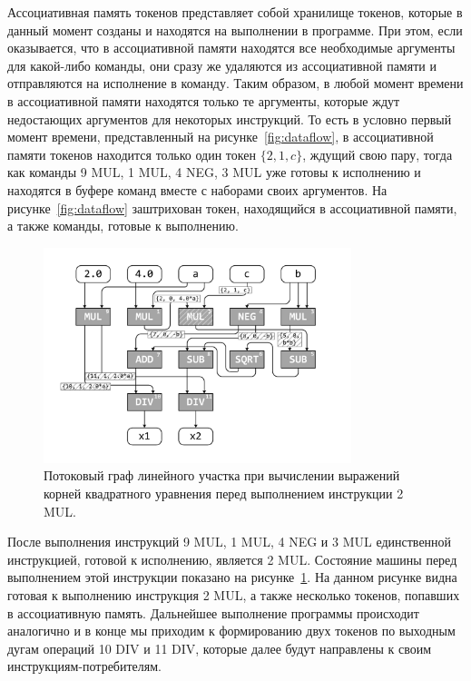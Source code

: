 \documentclass[
11pt,%
tightenlines,%
twoside,%
onecolumn,%
nofloats,%
nobibnotes,%
nofootinbib,%
superscriptaddress,%
noshowpacs,%
centertags]%
{revtex4}
\begin{document}
Ассоциативная память токенов представляет собой хранилище токенов, которые в данный момент созданы и находятся на выполнении в программе.
При этом, если оказывается, что в ассоциативной памяти находятся все необходимые аргументы для какой-либо команды, они сразу же удаляются из ассоциативной памяти и отправляются на исполнение в команду.
Таким образом, в любой момент времени в ассоциативной памяти находятся только те аргументы, которые ждут недостающих аргументов для некоторых инструкций.
То есть в условно первый момент времени, представленный на рисунке~\ref{fig:dataflow}, в ассоциативной памяти токенов находится только один токен $\{2, 1, c\}$, ждущий свою пару, тогда как команды 9 MUL, 1 MUL, 4 NEG, 3 MUL уже готовы к исполнению и находятся в буфере команд вместе с наборами своих аргументов.
На рисунке~\ref{fig:dataflow} заштрихован токен, находящийся в ассоциативной памяти, а также команды, готовые к выполнению.

\begin{figure}[h]
\setcaptionmargin{5mm}
\onelinecaptionsfalse %
\includegraphics[width=0.80\textwidth]{pics/dataflow2.pdf}
\caption{Потоковый граф линейного участка при вычислении выражений корней квадратного уравнения перед выполнением инструкции 2 MUL.}\label{fig:dataflow2}
\end{figure}

После выполнения инструкций 9 MUL, 1 MUL, 4 NEG и 3 MUL единственной инструкцией, готовой к исполнению, является 2 MUL.
Состояние машины перед выполнением этой инструкции показано на рисунке~\ref{fig:dataflow2}.
На данном рисунке видна готовая к выполнению инструкция 2 MUL, а также несколько токенов, попавших в ассоциативную память.
Дальнейшее выполнение программы происходит аналогично и в конце мы приходим к формированию двух токенов по выходным дугам операций 10 DIV и 11 DIV, которые далее будут направлены к своим инструкциям-потребителям.
\end{document}
